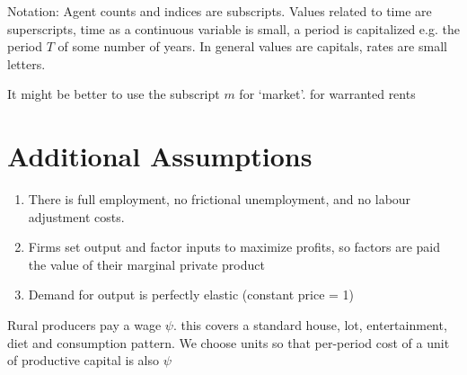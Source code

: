 Notation: 
Agent counts and indices are subscripts.
Values related to time are superscripts, time as a continuous 
variable is small, a period is capitalized e.g. the period $T$ of some number of years. 
In general values are capitals, rates are small letters.

It might be better to use the subscript $m$ for `market'.  for warranted rents

\section{Additional Assumptions}
\begin{enumerate}
\item There is full employment, no frictional unemployment, and no labour adjustment costs.
\item Firms set output and factor inputs to maximize profits, so factors are paid the value of their marginal private product
\item Demand for output is perfectly elastic (constant price = 1)
\end{enumerate}


Rural producers pay a wage $\psi$. this covers a standard house, lot, entertainment, diet and consumption pattern. We  choose units so that per-period cost of a unit of productive capital is also $\psi$